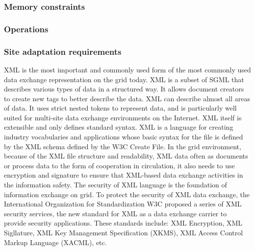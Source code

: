 
\subsubsection{Memory constraints}


\subsubsection{Operations}


\subsubsection{Site adaptation requirements}
XML is the most important and commonly used form of the most commonly used data exchange representation on the grid today. XML is a subset of SGML that describes various types of data in a structured way. It allows document creators to create new tags to better describe the data. XML can describe almost all areas of data. It uses strict nested tokens to represent data, and is particularly well suited for multi-site data exchange environments on the Internet. XML itself is extensible and only defines standard syntax. XML is a language for creating industry vocabularies and applications whose basic syntax for the file is defined by the XML schema defined by the W3C Create File. In the grid environment, because of the XML file structure and readability, XML data often as documents or process data to the form of cooperation in circulation, it also needs to use encryption and signature to ensure that XML-based data exchange activities in the information safety. The security of XML language is the foundation of information exchange on grid. To protect the security of XML data exchange, the International Organization for Standardization W3C proposed a series of XML security services, the new standard for XML as a data exchange carrier to provide security applications. These standards include: XML Encryption, XML Sigllature, XML Key Management Specification (XKMS), XML Access Control Markup Language (XACML), etc.

